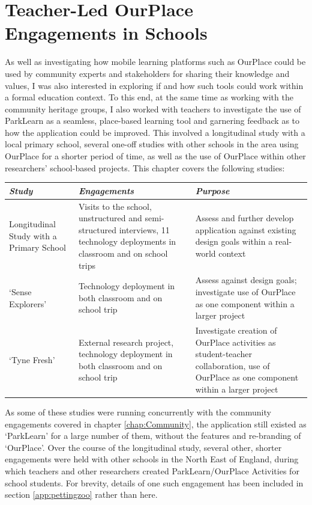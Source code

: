 \chapter{Teacher-Led OurPlace Engagements in Schools}
\label{chap:Teachers}

As well as investigating how mobile learning platforms such as OurPlace could be used by community experts and stakeholders for sharing their knowledge and values, I was also interested in exploring if and how such tools could work within a formal education context. To this end, at the same time as working with the community heritage groups, I also worked with teachers to investigate the use of ParkLearn as a seamless, place-based learning tool and garnering feedback as to how the application could be improved. This involved a longitudinal study with a local primary school, several one-off studies with other schools in the area using OurPlace for a shorter period of time, as well as the use of OurPlace within other researchers' school-based projects. This chapter covers the following studies:

{\raggedright
\begin{tabularx}{\textwidth}{| p{35mm} | p{50mm} | X |}
\hline
    {\small\textit{\textbf{Study}}}
    & {\small\textit{\textbf{Engagements}}} 
    & {\small\textit{\textbf{Purpose}}} \\
    \hline
    {\footnotesize Longitudinal Study with a Primary School }
    & {\footnotesize Visits to the school, unstructured and semi-structured interviews, 11 technology deployments in classroom and on school trips} 
    & {\footnotesize Assess and further develop application against existing design goals within a real-world context} \\
    \hline
    {\footnotesize `Sense Explorers' }
    & {\footnotesize Technology deployment in both classroom and on school trip} 
    & {\footnotesize Assess against design goals; investigate use of OurPlace as one component within a larger project}  \\
    \hline
    {\footnotesize `Tyne Fresh' }
    & {\footnotesize External research project, technology deployment in both classroom and on school trip} 
    & {\footnotesize Investigate creation of OurPlace activities as student-teacher collaboration, use of OurPlace as one component within a larger project}  \\
    \hline
\end{tabularx}
}

As some of these studies were running concurrently with the community engagements covered in chapter \ref{chap:Community}, the application still existed as `ParkLearn' for a large number of them, without the features and re-branding of `OurPlace'. Over the course of the longitudinal study, several other, shorter engagements were held with other schools in the North East of England, during which teachers and other researchers created ParkLearn/OurPlace Activities for school students. For brevity, details of one such engagement has been included in section \ref{app:pettingzoo} rather than here. 

